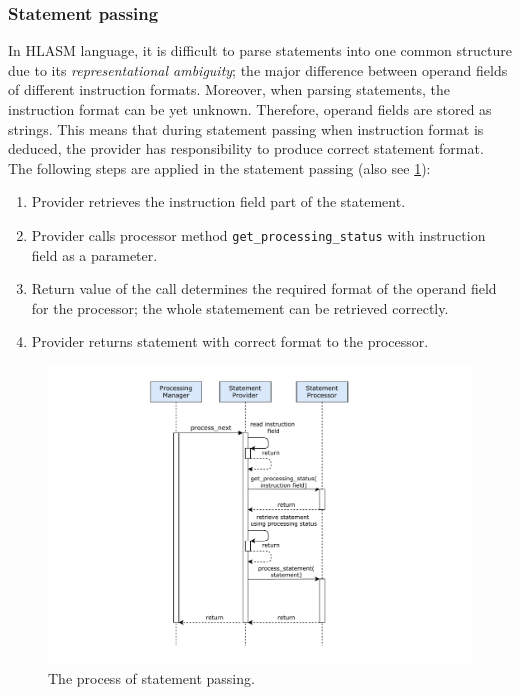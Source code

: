 \subsubsection{Statement passing}
\label{lab06:proc_stat}

In HLASM language, it is difficult to parse statements into one common structure due to its \emph{representational ambiguity}; the major difference between operand fields of different instruction formats. Moreover, when parsing statements, the instruction format can be yet unknown. Therefore, operand fields are stored as strings. This means that during statement passing when instruction format is deduced, the provider has responsibility to produce correct statement format. The following steps are applied in the statement passing (also see \cref{fig06:process_next}):

\begin{enumerate}
	\item Provider retrieves the instruction field part of the statement.
	\item Provider calls processor method \texttt{get\_processing\_status} with instruction field as a parameter.
	\item Return value of the call determines the required format of the operand field for the processor; the whole statemement can be retrieved correctly.
	\item Provider returns statement with correct format to the processor. 
\end{enumerate}

\begin{figure}
	\centering
	\includegraphics[width=13cm]{img/process_next}
	\caption{The process of statement passing.}
	\label{fig06:process_next}
\end{figure}


